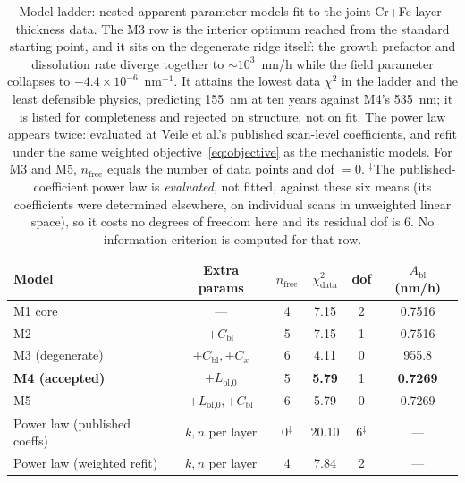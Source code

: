 \documentclass[pdflatex,sn-nature]{sn-jnl}
\begin{document}
\begin{table}[htbp]
\centering
\caption{Model ladder: nested apparent-parameter models fit to the
joint Cr+Fe layer-thickness data. The M3 row is the interior optimum
reached from the standard starting point, and it sits on the degenerate
ridge itself: the growth prefactor and dissolution rate diverge together
to $\sim\!10^{3}$~nm/h while the field parameter collapses to
$-4.4\times10^{-6}$~nm$^{-1}$. It attains the lowest data $\chi^2$ in
the ladder and the least defensible physics, predicting 155~nm at ten
years against M4's 535~nm; it is listed for completeness and rejected on
structure, not on fit.
The power law appears twice: evaluated at Veile et al.'s published
scan-level coefficients, and refit under the same weighted
objective~\eqref{eq:objective} as the mechanistic models. For M3 and
M5, $n_\text{free}$ equals the number of data points and dof $=0$.
$^\ddagger$The published-coefficient power law is \emph{evaluated}, not
fitted, against these six means (its coefficients were determined elsewhere, on individual scans in unweighted linear space), so it costs
no degrees of freedom here and its residual dof is 6. No information
criterion is computed for that row.}
\label{tab:ladder}
\begin{tabular}{lccccc}
\toprule
Model & Extra params & $n_\text{free}$ & $\chi^2_\text{data}$ & dof & $A_\text{bl}$ (nm/h) \\
\midrule
M1 core & --- & 4 & 7.15 & 2 & 0.7516 \\
M2 & $+C_\text{bl}$ & 5 & 7.15 & 1 & 0.7516 \\
M3 (degenerate) & $+C_\text{bl}, +C_x$ & 6 & 4.11 & 0 & 955.8 \\
\textbf{M4 (accepted)} & $+L_\text{ol,0}$ & 5 & \textbf{5.79} & 1 & \textbf{0.7269} \\
M5 & $+L_\text{ol,0}, +C_\text{bl}$ & 6 & 5.79 & 0 & 0.7269 \\
Power law (published coeffs) & $k,n$ per layer & 0$^\ddagger$ & 20.10 & 6$^\ddagger$ & --- \\
Power law (weighted refit) & $k,n$ per layer & 4 & 7.84 & 2 & --- \\
\bottomrule
\end{tabular}
\end{table}
\end{document}
